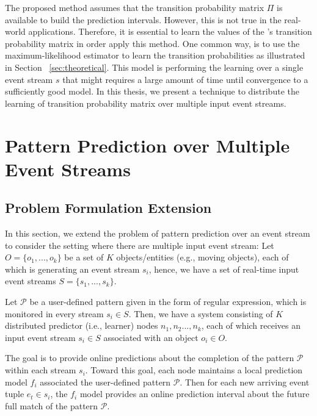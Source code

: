 \par The proposed method assumes that the transition probability matrix $\Pi$ is available to build the prediction intervals. However, this is not true in the real-world applications.
Therefore, it is essential to learn the values of the \pmcmr's transition probability matrix in order apply this method. One common way, is to use the maximum-likelihood estimator to learn the transition probabilities as illustrated in Section ~\ref{sec:theoretical}. This model is performing the learning over a single event stream $s$ that might requires a large amount of time until convergence to a sufficiently good model. In this thesis, we present a technique to distribute the learning of  transition probability matrix over multiple input event streams.

\section{Pattern Prediction over Multiple Event Streams}

\subsection{Problem Formulation Extension}

\par In this section, we extend the problem of pattern prediction over an event stream to consider the setting where there are multiple input event stream: 
Let $O = \{ o_1, ..., o_k\}$ be a set of \emph{$K$} objects/entities (e.g., moving objects), each of which is generating an event stream $s_i$, hence, we have a set of real-time input event streams $S = \{ s_1, ..., s_k\}$.

\par Let $\mathcal{P}$ be a user-defined pattern given in the form of regular expression, which is monitored in every stream $s_i \in S$. Then, we have a system consisting of \emph{$K$} distributed predictor (i.e., learner) nodes $n_1,n_2...,n_k$, each of which receives an input event stream $s_i\in S$ associated with an object $o_i \in O$.

\par  The goal is to provide online predictions about the completion of the pattern $\mathcal{P}$ within each stream $s_i$. Toward this goal, each node maintains a local prediction model $f_i$ associated the user-defined pattern $\mathcal{P}$. Then for each new arriving event tuple  $e_t \in s_i$, the $f_i$ model provides an online prediction interval about the future full match of the pattern $\mathcal{P}$.

